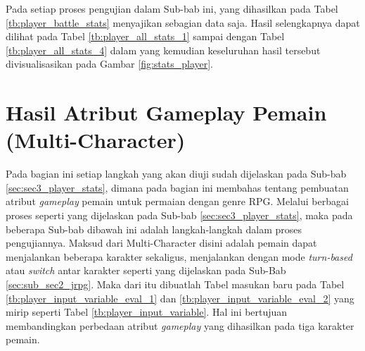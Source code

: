 Pada setiap proses pengujian dalam Sub-bab ini, yang dihasilkan pada Tabel \ref{tb:player_battle_stats} menyajikan sebagian data saja. Hasil selengkapnya dapat dilihat pada Tabel \ref{tb:player_all_stats_1} sampai dengan Tabel \ref{tb:player_all_stats_4} dalam  yang kemudian keseluruhan hasil tersebut divisualisasikan pada Gambar \ref{fig:stats_player}.
\vspace{1ex}

\section{Hasil Atribut Gameplay Pemain (Multi-Character)}
\label{sec:sec4_eval_multi-character_player}
\vspace{1ex}

Pada bagian ini setiap langkah yang akan diuji sudah dijelaskan pada Sub-bab \ref{sec:sec3_player_stats}, dimana pada bagian ini membahas tentang pembuatan atribut \textit{gameplay} pemain untuk permaian dengan genre RPG. Melalui berbagai proses seperti yang dijelaskan pada Sub-bab \ref{sec:sec3_player_stats}, maka pada beberapa Sub-bab dibawah ini adalah langkah-langkah dalam proses pengujiannya. Maksud dari Multi-Character disini adalah pemain dapat menjalankan beberapa karakter sekaligus, menjalankan dengan mode \textit{turn-based} atau \textit{switch} antar karakter seperti yang dijelaskan pada Sub-Bab \ref{sec:sub_sec2_jrpg}. Maka dari itu dibuatlah Tabel masukan baru pada Tabel \ref{tb:player_input_variable_eval_1} dan \ref{tb:player_input_variable_eval_2} yang mirip seperti Tabel \ref{tb:player_input_variable}. Hal ini bertujuan membandingkan perbedaan atribut \textit{gameplay} yang dihasilkan pada tiga karakter pemain.
\vspace{-2ex}

